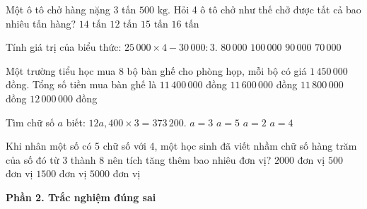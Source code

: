 \begin{ex} %
Một ô tô chở hàng nặng $3$ tấn $500\text{ kg}$. Hỏi 4 ô tô chở như thế chở được tất cả bao nhiêu tấn hàng?
\choice
{\True $14\text{ tấn}$}
{$12\text{ tấn}$}
{$15\text{ tấn}$}
{$16\text{ tấn}$}
\end{ex}

\begin{ex} %
Tính giá trị của biểu thức: $25\,000 \times 4 - 30\,000 : 3$.
\choice
{$80\,000$}
{$100\,000$}
{\True $90\,000$}
{$70\,000$}
\end{ex}

\begin{ex} %
Một trường tiểu học mua 8 bộ bàn ghế cho phòng họp, mỗi bộ có giá $1\,450\,000$ đồng. Tổng số tiền mua bàn ghế là
\choice
{$11\,400\,000$ đồng}
{\True $11\,600\,000$ đồng}
{$11\,800\,000$ đồng}
{$12\,000\,000$ đồng}
\end{ex}

\begin{ex} %
Tìm chữ số $a$ biết: $12a,400 \times 3 = 373\,200$.
\choice
{$a = 3$}
{$a = 5$}
{$a = 2$}
{\True $a = 4$}
\end{ex}

\begin{ex} %
Khi nhân một số có 5 chữ số với 4, một học sinh đã viết nhầm chữ số hàng trăm của số đó từ 3 thành 8 nên tích tăng thêm bao nhiêu đơn vị?
\choice
{\True $2000$ đơn vị}
{$500$ đơn vị}
{$1500$ đơn vị}
{$5000$ đơn vị}
\end{ex}

\textbf{Phần 2. Trắc nghiệm đúng sai}

